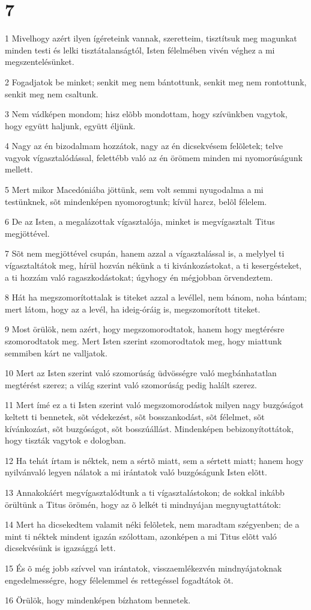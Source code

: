 \chapter{7}

\par 1 Mivelhogy azért ilyen ígéreteink vannak, szeretteim, tisztítsuk meg magunkat minden testi és lelki tisztátalanságtól, Isten félelmében vivén véghez a  mi megszentelésünket.
\par 2 Fogadjatok be minket; senkit meg nem bántottunk, senkit meg nem rontottunk, senkit meg nem csaltunk.
\par 3 Nem vádképen mondom; hisz elõbb mondottam, hogy szívünkben vagytok, hogy együtt haljunk, együtt éljünk.
\par 4 Nagy az én bizodalmam hozzátok, nagy az én dicsekvésem felõletek; telve vagyok vígasztalódással, felettébb való az én örömem minden mi nyomorúságunk mellett.
\par 5 Mert mikor Macedóniába jöttünk, sem volt semmi nyugodalma a mi testünknek, sõt mindenképen nyomorogtunk; kívül harcz, belõl félelem.
\par 6 De az Isten, a megalázottak vígasztalója, minket is megvígasztalt Titus megjöttével.
\par 7 Sõt nem megjöttével csupán, hanem azzal a vígasztalással is, a melylyel ti vígasztaltátok meg, hírül hozván nékünk a ti kivánkozástokat, a ti kesergésteket, a ti hozzám való ragaszkodástokat; úgyhogy én mégjobban örvendeztem.
\par 8 Hát ha megszomorítottalak is titeket azzal a levéllel, nem bánom, noha bántam; mert látom, hogy az a levél, ha ideig-óráig is, megszomorított titeket.
\par 9 Most örülök, nem azért, hogy megszomorodtatok, hanem hogy megtérésre szomorodtatok meg. Mert Isten szerint szomorodtatok meg, hogy miattunk semmiben kárt ne valljatok.
\par 10 Mert az Isten szerint való szomorúság üdvösségre való megbánhatatlan megtérést szerez; a világ szerint való szomorúság pedig halált szerez.
\par 11 Mert ímé ez a ti Isten szerint való megszomorodástok milyen nagy buzgóságot keltett ti bennetek, sõt védekezést, sõt bosszankodást, sõt félelmet, sõt kívánkozást, sõt buzgóságot, sõt bosszúállást. Mindenképen bebizonyítottátok, hogy tiszták vagytok e dologban.
\par 12 Ha tehát írtam is néktek, nem a sértõ miatt, sem a sértett miatt; hanem hogy nyilvánvaló legyen nálatok a mi irántatok való buzgóságunk Isten elõtt.
\par 13 Annakokáért megvígasztalódtunk a ti vígasztalástokon; de sokkal inkább örültünk a Titus örömén, hogy az õ lelkét ti mindnyájan megnyugtattátok:
\par 14 Mert ha dicsekedtem valamit néki felõletek, nem maradtam szégyenben; de a mint ti néktek mindent igazán szólottam, azonképen a mi Titus elõtt való dicsekvésünk is igazsággá lett.
\par 15 És õ még jobb szívvel van irántatok, visszaemlékezvén mindnyájatoknak engedelmességre, hogy félelemmel és rettegéssel fogadtátok õt.
\par 16 Örülök, hogy mindenképen bízhatom bennetek.

